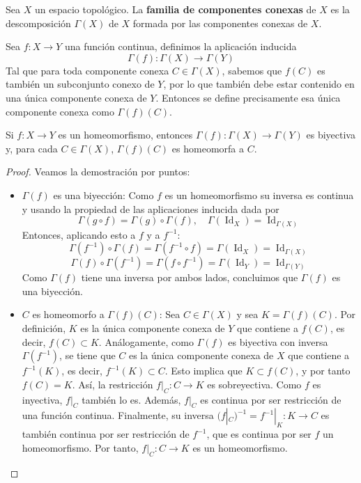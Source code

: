 \begin{definición}
    Sea $X$ un espacio topológico. La \textbf{familia de componentes conexas} de $X$ es la descomposición $\Gamma(X)$ de $X$ formada por las componentes conexas de $X$.
\end{definición}
\begin{definición}
    Sea $f: X \to Y$ una función continua, definimos la aplicación inducida $$\Gamma(f): \Gamma(X) \to \Gamma(Y)$$
    Tal que para toda componente conexa $C \in \Gamma(X)$, sabemos que $f(C)$ es también un subconjunto conexo de $Y$, por lo que también debe estar contenido en una única componente conexa de $Y$. Entonces se define precisamente esa única componente conexa como $\Gamma(f)(C)$.
\end{definición}
\begin{proposición}
    Si $f \colon X \to Y$ es un homeomorfismo, entonces $\Gamma(f) \colon \Gamma(X) \to \Gamma(Y)$ es biyectiva y, para cada $C \in \Gamma(X)$, $\Gamma(f)(C)$ es homeomorfa a $C$.
\end{proposición}
\begin{proof}
    Veamos la demostración por puntos: 
    \begin{itemize}
        \item $\Gamma(f)$ es una biyección: Como $f$ es un homeomorfismo su inversa es continua y usando la propiedad de las aplicaciones inducida dada por
        $$\Gamma(g \circ f) = \Gamma(g) \circ \Gamma(f), \quad \Gamma(\operatorname{Id}_X) = \operatorname{Id}_{\Gamma(X)}$$
        Entonces, aplicando esto a $f$ y a $f^{-1}$:
        $$\Gamma(f^{-1}) \circ \Gamma(f) = \Gamma(f^{-1} \circ f) = \Gamma(\operatorname{Id}_X) = \operatorname{Id}_{\Gamma(X)}$$
        $$\Gamma(f) \circ \Gamma(f^{-1}) = \Gamma(f \circ f^{-1}) = \Gamma(\operatorname{Id}_Y) = \operatorname{Id}_{\Gamma(Y)}$$
        Como $\Gamma(f)$ tiene una inversa por ambos lados, concluimos que $\Gamma(f)$ es una biyección.
        \item $C$ es homeomorfo a $\Gamma(f)(C)$: Sea $C \in \Gamma(X)$ y sea $K = \Gamma(f)(C)$. Por definición, $K$ es la única componente conexa de $Y$ que contiene a $f(C)$, es decir, $f(C) \subset K$. Análogamente, como $\Gamma(f)$ es biyectiva con inversa $\Gamma(f^{-1})$, se tiene que $C$ es la única componente conexa de $X$ que contiene a $f^{-1}(K)$, es decir, $f^{-1}(K) \subset C$. Esto implica que $K \subset f(C)$, y por tanto $f(C) = K$. Así, la restricción $f|_C \colon C \to K$ es sobreyectiva. Como $f$ es inyectiva, $f|_C$ también lo es. Además, $f|_C$ es continua por ser restricción de una función continua. Finalmente, su inversa $(f|_C)^{-1} = f^{-1}|_K \colon K \to C$ es también continua por ser restricción de $f^{-1}$, que es continua por ser $f$ un homeomorfismo. Por tanto, $f|_C \colon C \to K$ es un homeomorfismo.
    \end{itemize}
\end{proof}
